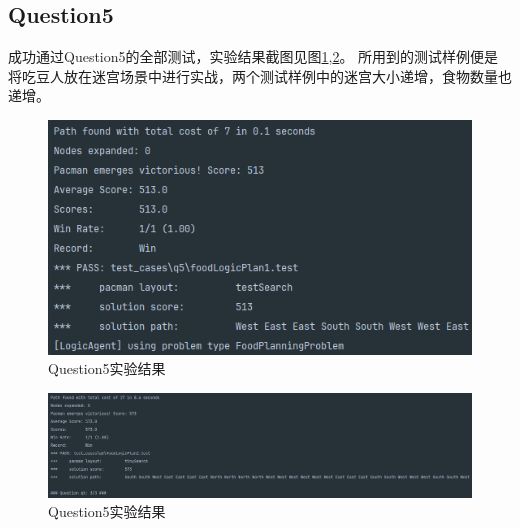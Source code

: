 \subsection{Question5}
成功通过Question5的全部测试，实验结果截图见图\ref{q51},\ref{q52}。
所用到的测试样例便是将吃豆人放在迷宫场景中进行实战，两个测试样例中的迷宫大小递增，食物数量也递增。
\begin{figure}[htbp]
    \centering
    \includegraphics[scale = 0.8]{pic/q51.png}
    \caption{Question5实验结果}\label{q51}
\end{figure}
\begin{figure}[htbp]
    \centering
    \includegraphics[width = \textwidth]{pic/q52.png}
    \caption{Question5实验结果}\label{q52}
\end{figure}
%
%
%
